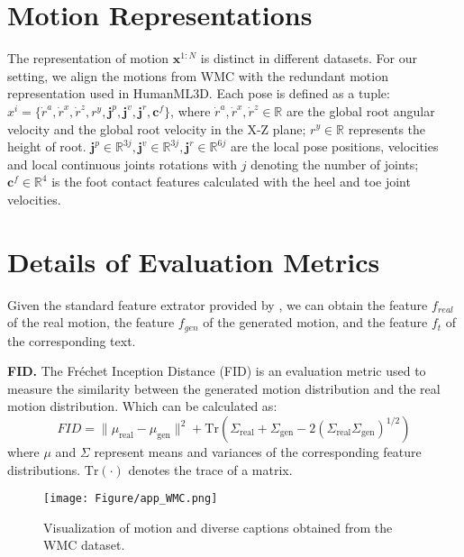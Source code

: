 \documentclass[letterpaper]{article} \usepackage{aaai24}
\begin{document}
\section{Motion Representations}
The representation of motion $ \bm{x}^{1:N} $ is distinct in different datasets. For our setting, we align the motions from WMC with the redundant motion representation \cite{Peng_2021,10.1145/3528223.3530178,10.1145/3355089.3356505}
used in HumanML3D. Each pose is defined as a tuple: $ x^i = \{\dot{r}^a, \dot{r}^x, \dot{r}^z, r^y, \mathbf{j}^p, \mathbf{j}^v, \mathbf{j}^r, \mathbf{c}^f\} $, where $ \dot{r}^a, \dot{r}^x, \dot{r}^z \in \mathbb{R} $ are the global root angular velocity and the global root velocity in the X-Z plane; $ r^y \in \mathbb{R} $ represents the height of root. $\mathbf{j}^p \in \mathbb{R}^{3j}, \mathbf{j}^v \in \mathbb{R}^{3j}, \mathbf{j}^r \in \mathbb{R}^{6j}$ are the local pose positions, velocities and local continuous joints rotations with $j$ denoting the number of joints; $ \mathbf{c}^f \in \mathbb{R}^{4} $ is the foot contact features calculated with the heel and toe joint velocities.


\section{Details of Evaluation Metrics}
Given the standard feature extrator provided by \cite{guo2022generating}, we can obtain the feature $f_{real}$ of the real motion, the feature $f_{gen}$ of the generated motion, and the feature $f_t$ of the corresponding text.

\noindent\textbf{FID.} The Fréchet Inception Distance (FID) is an evaluation metric used to measure the similarity between the generated motion distribution and the real motion distribution. Which can be calculated as:
\begin{equation}
    \textit{FID} = \|\mu_{\text{real}} - \mu_{\text{gen}}\|^2 + \text{Tr}(\Sigma_{\text{real}} + \Sigma_{\text{gen}} - 2(\Sigma_{\text{real}}\Sigma_{\text{gen}})^{1/2})
\end{equation}
where $\mu$ and $\Sigma$ represent means and variances of the corresponding feature distributions. $\text{Tr}(\cdot)$ denotes the trace of a matrix.
\begin{figure}[t] 
\texttt{[image: Figure/app\_WMC.png]} 
	\caption{Visualization of motion and diverse captions obtained from the WMC dataset.}
	\label{Fig:app_WMC} 
\end{figure}
\end{document}
